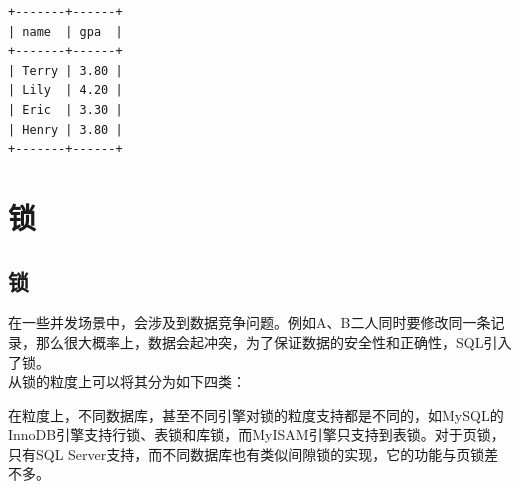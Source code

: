 \documentclass[12pt, openany, oneside]{book}
\begin{document}
\begin{tcolorbox}
    \begin{verbatim}
+-------+------+
| name  | gpa  |
+-------+------+
| Terry | 3.80 |
| Lily  | 4.20 |
| Eric  | 3.30 |
| Henry | 3.80 |
+-------+------+
	\end{verbatim}
\end{tcolorbox}

\newpage

\chapter{锁}

\section{锁}

在一些并发场景中，会涉及到数据竞争问题。例如A、B二人同时要修改同一条记录，那么很大概率上，数据会起冲突，为了保证数据的安全性和正确性，SQL引入了锁。 \\

从锁的粒度上可以将其分为如下四类：

\begin{table}[H]
    \centering
    \caption{锁的粒度分类}
\end{table}

在粒度上，不同数据库，甚至不同引擎对锁的粒度支持都是不同的，如MySQL的InnoDB引擎支持行锁、表锁和库锁，而MyISAM引擎只支持到表锁。对于页锁，只有SQL Server支持，而不同数据库也有类似间隙锁的实现，它的功能与页锁差不多。 \\
\end{document}
